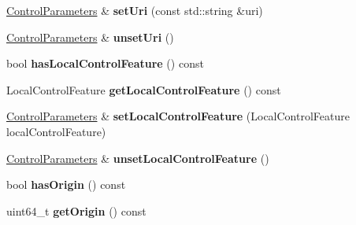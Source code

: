 \begin{DoxyCompactItemize}
\item 
\hyperlink{classndn_1_1nfd_1_1ControlParameters}{Control\+Parameters} \& {\bfseries set\+Uri} (const std\+::string \&uri)\hypertarget{classndn_1_1nfd_1_1ControlParameters_acd20827396c5c372e0c42e96ff430424}{}\label{classndn_1_1nfd_1_1ControlParameters_acd20827396c5c372e0c42e96ff430424}

\item 
\hyperlink{classndn_1_1nfd_1_1ControlParameters}{Control\+Parameters} \& {\bfseries unset\+Uri} ()\hypertarget{classndn_1_1nfd_1_1ControlParameters_a4815b6e3618445a6f70682726516295a}{}\label{classndn_1_1nfd_1_1ControlParameters_a4815b6e3618445a6f70682726516295a}

\item 
bool {\bfseries has\+Local\+Control\+Feature} () const\hypertarget{classndn_1_1nfd_1_1ControlParameters_a30129c02590b0f9b705c70a8b198f1ff}{}\label{classndn_1_1nfd_1_1ControlParameters_a30129c02590b0f9b705c70a8b198f1ff}

\item 
Local\+Control\+Feature {\bfseries get\+Local\+Control\+Feature} () const\hypertarget{classndn_1_1nfd_1_1ControlParameters_aca42851fd780a46a15cb687dda235e04}{}\label{classndn_1_1nfd_1_1ControlParameters_aca42851fd780a46a15cb687dda235e04}

\item 
\hyperlink{classndn_1_1nfd_1_1ControlParameters}{Control\+Parameters} \& {\bfseries set\+Local\+Control\+Feature} (Local\+Control\+Feature local\+Control\+Feature)\hypertarget{classndn_1_1nfd_1_1ControlParameters_a0194f44e35db23c907d7e88481bca4fb}{}\label{classndn_1_1nfd_1_1ControlParameters_a0194f44e35db23c907d7e88481bca4fb}

\item 
\hyperlink{classndn_1_1nfd_1_1ControlParameters}{Control\+Parameters} \& {\bfseries unset\+Local\+Control\+Feature} ()\hypertarget{classndn_1_1nfd_1_1ControlParameters_abc9961fc06f244b0aec331f690f003a7}{}\label{classndn_1_1nfd_1_1ControlParameters_abc9961fc06f244b0aec331f690f003a7}

\item 
bool {\bfseries has\+Origin} () const\hypertarget{classndn_1_1nfd_1_1ControlParameters_ae9ded087b740f384dbf12821bd2a00ff}{}\label{classndn_1_1nfd_1_1ControlParameters_ae9ded087b740f384dbf12821bd2a00ff}

\item 
uint64\+\_\+t {\bfseries get\+Origin} () const\hypertarget{classndn_1_1nfd_1_1ControlParameters_ae08b47f9aba8b330c97438c64438f397}{}\label{classndn_1_1nfd_1_1ControlParameters_ae08b47f9aba8b330c97438c64438f397}


\end{DoxyCompactItemize}
